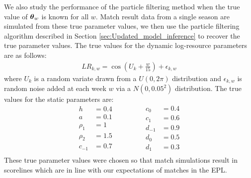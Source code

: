 We also study the performance of the particle filtering method when the true value of \(\boldsymbol{\theta}_w\) is known for all
\(w\). Match result data from a single season are simulated from these true parameter values, we then use the particle
filtering algorithm described in Section \ref{sec:Updated_model_inference} to recover the true parameter values. The
true values for the dynamic log-resource parameters are as follows:
\begin{align} 
LR_{k, w} = \cos\left(U_k + \frac{w}{15}\right) + \epsilon_{k, w}
\end{align}
where \(U_k\) is a random variate drawn from a \(U(0, 2\pi)\) distribution and \(\epsilon_{k, w}\) is random
noise added at each week \(w\) via a \(N(0, 0.05^2)\) distribution. The true values for the static parameters are:
\begin{equation}
\begin{aligned}
h &= 0.4 \\
a &= 0.1 \\
\rho_1 &= 1 \\
\rho_2 &= 1.5 \\
c_{-1} &= 0.7 \\
\end{aligned}
\qquad\qquad
\begin{aligned}
c_{0} &= 0.4 \\
c_{1} &= 0.6 \\
d_{-1} &= 0.9 \\
d_{0} &= 0.5 \\
d_{1} &= 0.3 \\
\end{aligned}
\end{equation}
These true parameter values were chosen so that match simulations result in scorelines which are in line with our
expectations of matches in the \gls{EPL}.


